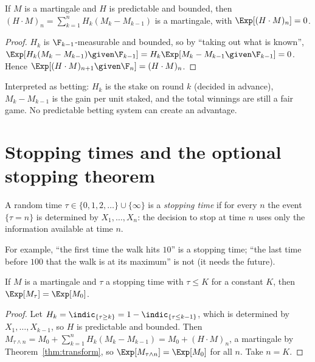 \begin{theorem}\label{thm:transform}
If $M$ is a martingale and $H$ is predictable and bounded, then
$(H\cdot M)_n=\sum_{k=1}^nH_k(M_k-M_{k-1})$ is a martingale, with $\Exp[(H\cdot M)_n]=0$.
\end{theorem}
\begin{proof}
$H_k$ is $\F_{k-1}$-measurable and bounded, so by ``taking out what is known'',
$\Exp[H_k(M_k-M_{k-1})\given\F_{k-1}]=H_k\Exp[M_k-M_{k-1}\given\F_{k-1}]=0$. Hence
$\Exp[(H\cdot M)_{n+1}\given\F_n]=(H\cdot M)_n$.
\end{proof}

Interpreted as betting: $H_k$ is the stake on round $k$ (decided in advance), $M_k-M_{k-1}$
is the gain per unit staked, and the total winnings are still a fair game. No predictable
betting system can create an advantage.

\section{Stopping times and the optional stopping theorem}

\begin{definition}
A random time $\tau\in\{0,1,2,\dots\}\cup\{\infty\}$ is a \emph{stopping time} if for every
$n$ the event $\{\tau=n\}$ is determined by $X_1,\dots,X_n$: the decision to stop at time $n$
uses only the information available at time $n$.
\end{definition}

For example, ``the first time the walk hits $10$'' is a stopping time; ``the last time before
$100$ that the walk is at its maximum'' is not (it needs the future).

\begin{theorem}\label{thm:ost0}
If $M$ is a martingale and $\tau$ a stopping time with $\tau\le K$ for a constant $K$, then
$\Exp[M_\tau]=\Exp[M_0]$.
\end{theorem}
\begin{proof}
Let $H_k=\indic_{\{\tau\ge k\}}=1-\indic_{\{\tau\le k-1\}}$, which is determined by
$X_1,\dots,X_{k-1}$, so $H$ is predictable and bounded. Then
$M_{\tau\wedge n}=M_0+\sum_{k=1}^nH_k(M_k-M_{k-1})=M_0+(H\cdot M)_n$, a martingale by
Theorem~\ref{thm:transform}, so $\Exp[M_{\tau\wedge n}]=\Exp[M_0]$ for all $n$. Take
$n=K$.
\end{proof}

